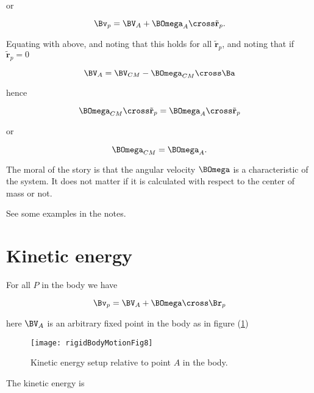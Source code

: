 or

\begin{equation}\label{eqn:rigidBodyMotion:280}
\Bv_p = \BV_A + \BOmega_A \cross \tilde{\mathbf{r}}_p.
\end{equation}

Equating with above, and noting that this holds for all $\tilde{\mathbf{r}}_p$, and noting that if $\tilde{\mathbf{r}}_p = 0$

\begin{equation}\label{eqn:rigidBodyMotion:300}
\BV_A = \BV_{CM} - \BOmega_{CM} \cross \Ba
\end{equation}

hence

\begin{equation}\label{eqn:rigidBodyMotion:320}
\BOmega_{CM} \cross \tilde{\mathbf{r}}_p = \BOmega_A \cross \tilde{\mathbf{r}}_p
\end{equation}

or

\begin{equation}\label{eqn:rigidBodyMotion:340}
\BOmega_{CM} = \BOmega_A.
\end{equation}

The moral of the story is that the angular velocity $\BOmega$ is a characteristic of the system.  It does not matter if it is calculated with respect to the center of mass or not.

See some examples in the notes.

\section{Kinetic energy}

For all $P$ in the body we have

\begin{equation}\label{eqn:rigidBodyMotion:360}
\Bv_p = \BV_A + \BOmega \cross \Br_p
\end{equation}

here $\BV_A$ is an arbitrary fixed point in the body as in figure (\ref{fig:rigidBodyMotion:rigidBodyMotionFig8})

\begin{figure}[htp]
   \centering
   \texttt{[image: rigidBodyMotionFig8]}
   \caption{Kinetic energy setup relative to point $A$ in the body.}\label{fig:rigidBodyMotion:rigidBodyMotionFig8}
\end{figure}

The kinetic energy is

